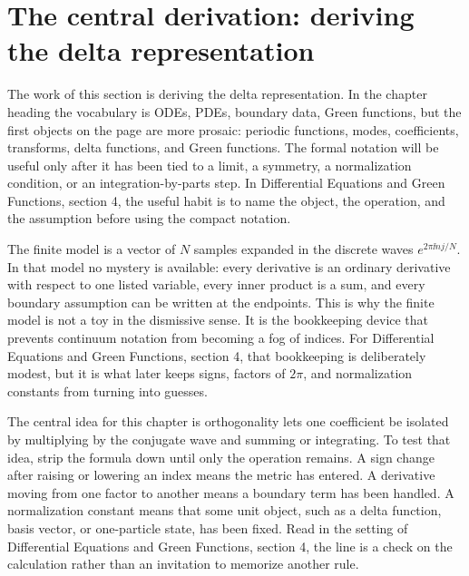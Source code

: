 \section{The central derivation: deriving the delta representation}













The work of this section is deriving the delta representation.  In the chapter heading the vocabulary is ODEs, PDEs, boundary data, Green functions, but the first objects on the page are more prosaic: periodic functions, modes, coefficients, transforms, delta functions, and Green functions.  The formal notation will be useful only after it has been tied to a limit, a symmetry, a normalization condition, or an integration-by-parts step.  In Differential Equations and Green Functions, section 4, the useful habit is to name the object, the operation, and the assumption before using the compact notation.

The finite model is a vector of \(N\) samples expanded in the discrete waves \(e^{2\pi \ii nj/N}\).  In that model no mystery is available: every derivative is an ordinary derivative with respect to one listed variable, every inner product is a sum, and every boundary assumption can be written at the endpoints.  This is why the finite model is not a toy in the dismissive sense.  It is the bookkeeping device that prevents continuum notation from becoming a fog of indices.  For Differential Equations and Green Functions, section 4, that bookkeeping is deliberately modest, but it is what later keeps signs, factors of \(2\pi\), and normalization constants from turning into guesses.

The central idea for this chapter is orthogonality lets one coefficient be isolated by multiplying by the conjugate wave and summing or integrating.  To test that idea, strip the formula down until only the operation remains.  A sign change after raising or lowering an index means the metric has entered.  A derivative moving from one factor to another means a boundary term has been handled.  A normalization constant means that some unit object, such as a delta function, basis vector, or one-particle state, has been fixed.  Read in the setting of Differential Equations and Green Functions, section 4, the line is a check on the calculation rather than an invitation to memorize another rule.

